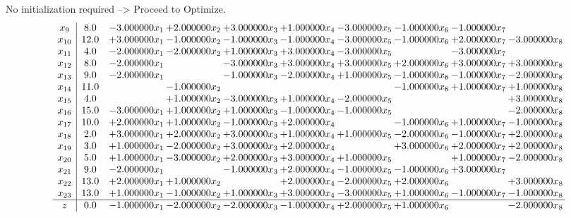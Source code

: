 \documentclass[10pt]{article}
\begin{document}
No initialization required --> Proceed to Optimize. 
\[\begin{array}{c| c c@{\hskip 2pt} c@{\hskip 2pt} c@{\hskip 2pt} c@{\hskip 2pt} c@{\hskip 2pt} c@{\hskip 2pt} c@{\hskip 2pt} c@{\hskip 2pt} }
 x_{9}   &  8.0 & -3.000000 x_{1} & + 2.000000 x_{2} & + 3.000000 x_{3} & + 1.000000 x_{4} & -3.000000 x_{5} & -1.000000 x_{6} & -1.000000 x_{7} &   \\
 x_{10}   &  12.0 & + 3.000000 x_{1} & -1.000000 x_{2} & -1.000000 x_{3} & -1.000000 x_{4} & -3.000000 x_{5} & -1.000000 x_{6} & + 2.000000 x_{7} & -3.000000 x_{8}\\
 x_{11}   &  4.0 & -2.000000 x_{1} & -2.000000 x_{2} & + 1.000000 x_{3} & + 3.000000 x_{4} & -3.000000 x_{5} &   & -3.000000 x_{7} &   \\
 x_{12}   &  8.0 & -2.000000 x_{1} &   & -3.000000 x_{3} & + 3.000000 x_{4} & + 3.000000 x_{5} & + 2.000000 x_{6} & + 3.000000 x_{7} & + 3.000000 x_{8}\\
 x_{13}   &  9.0 & -2.000000 x_{1} &   & -1.000000 x_{3} & -2.000000 x_{4} & + 1.000000 x_{5} & -1.000000 x_{6} & -1.000000 x_{7} & -2.000000 x_{8}\\
 x_{14}   &  11.0  &   & -1.000000 x_{2} &    &    &   & -1.000000 x_{6} & + 1.000000 x_{7} & + 1.000000 x_{8}\\
 x_{15}   &  4.0  &   & + 1.000000 x_{2} & -3.000000 x_{3} & + 1.000000 x_{4} & -2.000000 x_{5} &    &   & + 3.000000 x_{8}\\
 x_{16}   &  15.0 & -3.000000 x_{1} & + 1.000000 x_{2} & + 1.000000 x_{3} & -1.000000 x_{4} & -1.000000 x_{5} &    &   & -2.000000 x_{8}\\
 x_{17}   &  10.0 & + 2.000000 x_{1} & + 1.000000 x_{2} & -1.000000 x_{3} & + 2.000000 x_{4} &   & -1.000000 x_{6} & + 1.000000 x_{7} & -1.000000 x_{8}\\
 x_{18}   &  2.0 & + 3.000000 x_{1} & + 2.000000 x_{2} & + 3.000000 x_{3} & + 1.000000 x_{4} & + 1.000000 x_{5} & -2.000000 x_{6} & -1.000000 x_{7} & + 2.000000 x_{8}\\
 x_{19}   &  3.0 & + 1.000000 x_{1} & -2.000000 x_{2} & + 3.000000 x_{3} & + 2.000000 x_{4} &   & + 3.000000 x_{6} & + 2.000000 x_{7} & + 2.000000 x_{8}\\
 x_{20}   &  5.0 & + 1.000000 x_{1} & -3.000000 x_{2} & + 2.000000 x_{3} & + 3.000000 x_{4} & + 1.000000 x_{5} &   & + 1.000000 x_{7} & -2.000000 x_{8}\\
 x_{21}   &  9.0 & -2.000000 x_{1} &   & -1.000000 x_{3} & + 2.000000 x_{4} & -1.000000 x_{5} & -1.000000 x_{6} & + 3.000000 x_{7} &   \\
 x_{22}   &  13.0 & + 2.000000 x_{1} & + 1.000000 x_{2} &   & + 2.000000 x_{4} & -2.000000 x_{5} & + 2.000000 x_{6} &   & + 3.000000 x_{8}\\
 x_{23}   &  13.0 & + 1.000000 x_{1} & -1.000000 x_{2} & + 1.000000 x_{3} & + 3.000000 x_{4} & -3.000000 x_{5} & + 1.000000 x_{6} & -1.000000 x_{7} & -1.000000 x_{8}\\
\hline
z    &  0.0 & -1.000000 x_{1} & -2.000000 x_{2} & -2.000000 x_{3} & -1.000000 x_{4} & + 2.000000 x_{5} & + 1.000000 x_{6} &   & -2.000000 x_{8}\\
\end{array}\]
\end{document}
